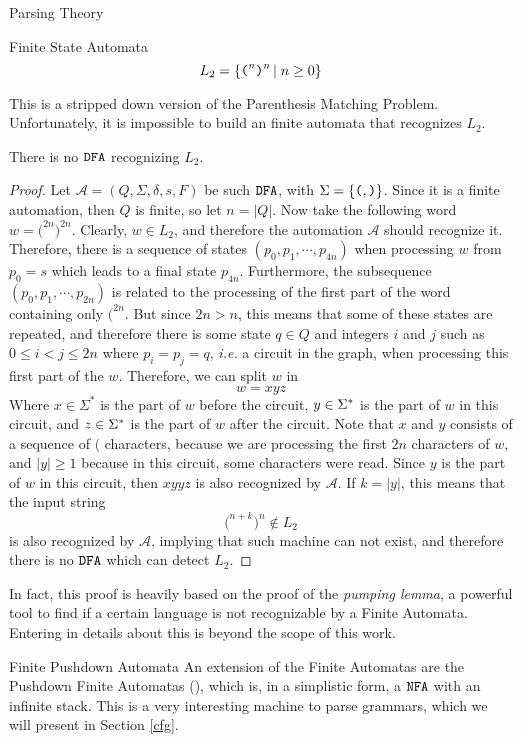 \begin{section}{Parsing Theory}
\begin{subsection}{Finite State Automata}
$$L_2 = \{\texttt{(}^n \texttt{)}^n\,|\;n \geq 0\}$$

This is a stripped down version of the Parenthesis Matching Problem.
Unfortunately, it is impossible to build an finite automata
that recognizes $L_2$.

\begin{lemma}
There is no $\texttt{DFA}$ recognizing $L_2$.
\end{lemma}
\begin{proof}
Let $\mathcal{A} = (Q, \Sigma, \delta, s, F)$ be such $\texttt{DFA}$,
with $\Sigma = \{\texttt{(}, \texttt{)}\}$.
Since it is a finite automation, then $Q$ is finite, so let
$n = |Q|$. Now take the following word $w = \texttt{(}^{2n}\texttt{)}^{2n}$.
Clearly, $w \in L_2$, and therefore the automation $\mathcal{A}$ should
recognize it. Therefore, there is a sequence of states
$(p_0, p_1, \cdots, p_{4n})$ when processing $w$ from $p_0 = s$ which leads to a
final state $p_{4n}$. Furthermore, the subsequence $(p_0, p_1, \cdots, p_{2n})$ is
related to the processing of the first part of the word containing only
$\texttt{(}^{2n}$. But since $2n > n$, this means that some of these
states are repeated, and therefore there is some state $q \in Q$ and integers
$i$ and $j$ such as $0 \leq i < j \leq 2n$ where $p_i = p_j = q$,
\textit{i.e.} a circuit in the graph, when processing this first part of the $w$.
Therefore, we can split $w$ in 
$$w = xyz$$
Where $x \in \Sigma^*$ is the part of $w$ before the circuit, $y \in \Sigma^*$ is
the part of $w$ in this circuit, and $z \in \Sigma^*$ is the part of $w$ after the
circuit. Note that $x$ and $y$ consists of a sequence of $\texttt{(}$
characters, because we are processing the first $2n$ characters of $w$,
and $|y| \geq 1$ because in this circuit, some characters were
read.
Since $y$ is the part of $w$ in this circuit, then
$ xyyz $
is also recognized by $\mathcal{A}$. If $k = |y|$, this means that
the input string
$$ \texttt{(}^{n+k}\texttt{)}^n \not\in L_2$$
is also recognized by $\mathcal{A}$, implying that such machine can
not exist, and therefore there is no $\texttt{DFA}$ which can detect
$L_2$.
\end{proof}

In fact, this proof is heavily based on the proof of the \textit{pumping lemma},
a powerful tool to find if a certain language is not recognizable by a
Finite Automata. Entering in details about this is beyond the scope of
this work.

\end{subsection}

\begin{subsection}{Finite Pushdown Automata}
	An extension of the Finite Automatas are the Pushdown Finite Automatas
	(), which is, in a simplistic form, a $\texttt{NFA}$
	with an infinite stack. This is a very interesting machine to
	parse grammars, which we will present in Section \ref{cfg}.


\end{subsection}
\end{section}

